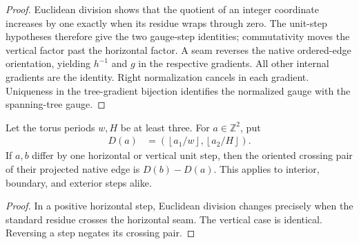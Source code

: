 \begin{proof}\leanok
    Euclidean division shows that the quotient of an integer coordinate
    increases by one exactly when its residue wraps through zero.
    The unit-step hypotheses therefore give the two gauge-step
    identities; commutativity moves the vertical factor past the
    horizontal factor. A seam reverses the native ordered-edge
    orientation, yielding $h^{-1}$ and $g$ in the respective gradients.
    All other internal gradients are the identity. Right normalization
    cancels in each gradient. Uniqueness in the tree-gradient bijection
    identifies the normalized gauge with the spanning-tree gauge.
\end{proof}

\begin{lemma}%
    \label{thm:peps_torus_integer_unit_step_winding}
    \leanok
    Let the torus periods $w,H$ be at least three. For $a\in\mathbb Z^2$,
    put
    \begin{align}
        D(a) & =\left(\left\lfloor a_1/w\right\rfloor,
        \left\lfloor a_2/H\right\rfloor\right).
    \end{align}
    If $a,b$ differ by one horizontal or vertical unit step, then the
    oriented crossing pair of their projected native edge is $D(b)-D(a)$.
    This applies to interior, boundary, and exterior steps alike.
\end{lemma}
\begin{proof}\leanok
    In a positive horizontal step, Euclidean division changes precisely
    when the standard residue crosses the horizontal seam. The vertical
    case is identical. Reversing a step negates its crossing pair.
\end{proof}

